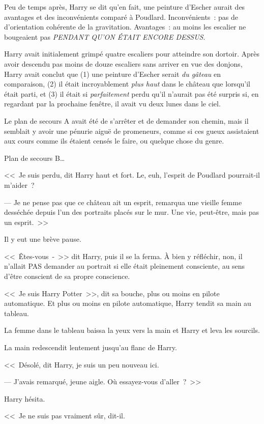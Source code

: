 Peu de temps après, Harry se dit qu'en fait, une peinture d'Escher aurait des avantages et des inconvénients comparé à Poudlard. Inconvénients~: pas de d'orientation cohérente de la gravitation. Avantages~: au moins les escalier ne bougeaient pas \emph{PENDANT QU'ON ÉTAIT ENCORE DESSUS}.

Harry avait initialement grimpé quatre escaliers pour atteindre son dortoir. Après avoir descendu pas moins de douze escaliers sans arriver en vue des donjons, Harry avait conclut que (1) une peinture d'Escher serait \emph{du gâteau} en comparaison, (2) il était incroyablement \emph{plus haut} dans le château que lorsqu'il était parti, et (3) il était si \emph{parfaitement} perdu qu'il n'aurait pas été surpris si, en regardant par la prochaine fenêtre, il avait vu deux lunes dans le ciel.

Le plan de secours A avait été de s'arrêter et de demander son chemin, mais il semblait y avoir une pénurie aiguë de promeneurs, comme si ces gueux assistaient aux cours comme ils étaient censés le faire, ou quelque chose du genre.

Plan de secours B…

<<~Je suis perdu, dit Harry haut et fort. Le, euh, l'esprit de Poudlard pourrait-il m'aider~?

--- Je ne pense pas que ce château ait un esprit, remarqua une vieille femme desséchée depuis l'un des portraits placés sur le mur. Une vie, peut-être, mais pas un esprit.~>>

Il y eut une brève pause.

<<~Êtes-vous~-~>> dit Harry, puis il se la ferma. À bien y réfléchir, non, il n'allait PAS demander au portrait si elle était pleinement consciente, au sens d'être conscient de sa propre conscience.

<<~Je suis Harry Potter~>>, dit sa bouche, plus ou moins en pilote automatique. Et plus ou moins en pilote automatique, Harry tendit sa main au tableau.

La femme dans le tableau baissa la yeux vers la main et Harry et leva les sourcils.

La main redescendit lentement jusqu'au flanc de Harry.

<<~Désolé, dit Harry, je suis un peu nouveau ici.

--- J'avais remarqué, jeune aigle. Où essayez-vous d'aller~?~>>

Harry hésita.

<<~Je ne suis pas vraiment sûr, dit-il.

